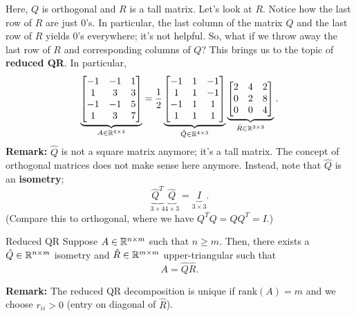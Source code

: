 \documentclass[letterpaper]{article}
\newcommand{\0}{\mathbf{0}}
\begin{document}
Here, $Q$ is orthogonal and $R$ is a tall matrix. Let's look at $R$. Notice how the last row of $R$ are just 0's. In particular, the last column of the matrix $Q$ and the last row of $R$ yields 0's everywhere; it's not helpful. So, what if we throw away the last row of $R$ and corresponding columns of $Q$? This brings us to the topic of \textbf{reduced QR}. In particular,
\[\underbrace{\begin{bmatrix}
    -1 & -1 & 1 \\ 
    1 & 3 & 3 \\ 
    -1 & -1 & 5 \\ 
    1 & 3 & 7
\end{bmatrix}}_{A \in \mathbb{R}^{4 \times 4}} = \frac{1}{2} \underbrace{\begin{bmatrix}
    -1 & 1 & -1 \\ 
    1 & 1 & -1 \\ 
    -1 & 1 & 1 \\ 
    1 & 1 & 1
\end{bmatrix}}_{\hat{Q} \in \mathbb{R}^{4 \times 3}} \underbrace{\begin{bmatrix}
    2 & 4 & 2 \\ 
    0 & 2 & 8 \\ 
    0 & 0 & 4
\end{bmatrix}}_{\hat{R} \in \mathbb{R}^{3 \times 3}}.\]
\textbf{Remark:} $\hat{Q}$ is not a square matrix anymore; it's a tall matrix. The concept of orthogonal matrices does not make sense here anymore. Instead, note that $\hat{Q}$ is an \textbf{isometry}; 
\[\underbrace{\hat{Q}^T}_{3 \times 4} \underbrace{\hat{Q}}_{4 \times 3} = \underbrace{I}_{3 \times 3}.\]
(Compare this to orthogonal, where we have $Q^T Q = QQ^T = I$.)

\begin{theorem}{Reduced QR}{}
    Suppose $A \in \mathbb{R}^{n \times m}$ such that $n \geq m$. Then, there exists a $\hat{Q} \in \mathbb{R}^{n \times m}$ isometry and $\hat{R} \in \mathbb{R}^{m \times m}$ upper-triangular such that \[A = \hat{Q}\hat{R}.\]
\end{theorem}
\textbf{Remark:} The reduced QR decomposition is unique if $\text{rank}(A) = m$ and we choose $r_{ii} > 0$ (entry on diagonal of $\hat{R}$). 
\end{document}

